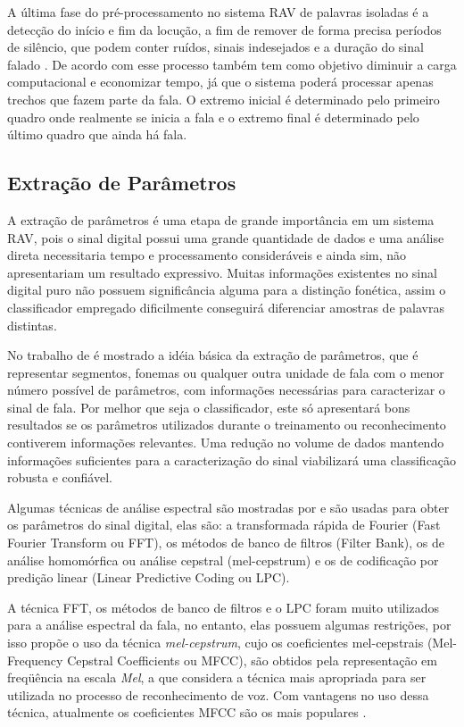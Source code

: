 A última fase do pré-processamento no sistema RAV de palavras isoladas é a detecção do início e fim da locução, a fim de remover de forma precisa períodos de silêncio, que podem conter ruídos, sinais indesejados e a duração do sinal falado \cite{RavIsolAnderson}. De acordo com  esse processo também tem como objetivo diminuir a carga computacional e economizar tempo, já que o sistema poderá processar apenas trechos que fazem parte da fala.
 O extremo inicial é determinado pelo primeiro quadro onde realmente se inicia a fala e o extremo final é
determinado pelo último quadro que ainda há fala.

\subsection{Extração de Parâmetros} 
A extração de parâmetros é uma etapa de grande importância em um sistema RAV, pois o sinal digital possui uma grande quantidade de dados e uma análise direta necessitaria tempo e processamento consideráveis e ainda sim, não apresentariam um resultado expressivo. Muitas informações existentes no sinal digital puro não possuem significância alguma para a distinção fonética, assim o classificador empregado dificilmente conseguirá diferenciar amostras de palavras distintas.

No trabalho de  é mostrado a idéia básica da extração de parâmetros, que é representar segmentos, fonemas ou qualquer outra unidade de fala com o menor número possível de parâmetros, com informações necessárias para caracterizar o sinal de fala. Por melhor que seja o classificador, este só apresentará bons resultados se os parâmetros utilizados durante o treinamento ou reconhecimento contiverem informações relevantes. Uma redução no volume de dados mantendo informações suficientes para a caracterização do sinal viabilizará uma classificação robusta e confiável.

Algumas técnicas de análise espectral são mostradas por  e são usadas para obter os parâmetros do sinal digital, elas são: a transformada rápida de Fourier (Fast Fourier Transform ou FFT), os métodos de banco de filtros (Filter Bank), os de análise homomórfica ou análise cepstral (mel-cepstrum) e os de codificação por
predição linear (Linear Predictive Coding ou LPC).

A técnica FFT, os métodos de banco de filtros e o LPC foram muito utilizados para a análise espectral da fala, no entanto, elas possuem algumas restrições, por isso  propõe o uso da técnica \textit{mel-cepstrum}, cujo os coeficientes mel-cepstrais (Mel-Frequency Cepstral Coefficients ou MFCC), são obtidos pela representação em freqüência na escala \textit{Mel}, a que considera a técnica mais apropriada para ser
utilizada no processo de reconhecimento de voz. Com vantagens no uso dessa técnica, atualmente os coeficientes MFCC
são os mais populares \cite{IsolatWordBouroba}.

